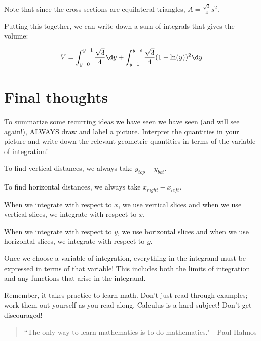 \documentclass{ximera}
\begin{document}
\begin{example}
\begin{explanation}
Note that since the cross sections are equilateral triangles, $A= \frac{\sqrt{3}}{4}s^2$.

Putting this together, we can write down a sum of integrals that gives the volume:

\[V= \int_{y= 0}^{y=1}\frac{\sqrt{3}}{4} \d y + \int_{y= 1}^{y=e} \frac{\sqrt{3}}{4}(1-\ln(y))^2 \d y \]

            
            
\end{explanation}            
\end{example}

\section{Final thoughts}
To summarize some recurring ideas we have seen we have seen (and will see again!), ALWAYS draw and label a picture.  Interpret the quantities in your picture and write down the relevant geometric quantities in terms of the variable of integration!


\begin{fact}
To find vertical distances, we always take $y_{top} - y_{bot}$.

To find horizontal distances, we always take $x_{right}-x_{left}$.
\end{fact}

\begin{fact}
When we integrate with respect to $x$, we use vertical slices and when we use vertical slices, we integrate with respect to $x$.

When we integrate with respect to $y$, we use horizontal slices and when we use horizontal slices, we integrate with respect to $y$.
\end{fact}

\begin{fact}
Once we choose a variable of integration, everything in the integrand must be expressed in terms of that variable!  This includes both the limits of integration and any functions that arise in the integrand.
\end{fact}

Remember, it takes practice to learn math.  Don't just read through examples; work them out yourself as you read along. Calculus is a hard subject! Don't get discouraged!

\begin{quote}
``The only way to learn mathematics is to do mathematics." - Paul Halmos
\end{quote}
\end{document}
